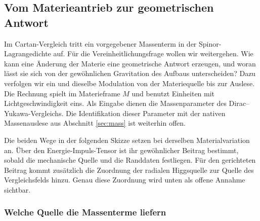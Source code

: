 \subsection{Vom Materieantrieb zur geometrischen Antwort}
\label{sec:op5-coupling}

Im Cartan-Vergleich tritt ein vorgegebener Massenterm in der Spinor-Lagrangedichte auf. Für die Vereinheitlichungsfrage wollen wir weitergehen. Wie kann eine Änderung der Materie eine geometrische Antwort erzeugen, und woran lässt sie sich von der gewöhnlichen Gravitation des Aufbaus unterscheiden? Dazu verfolgen wir ein und dieselbe Modulation von der Materiequelle bis zur Auslese. Die Rechnung spielt im Materieframe \(M\) und benutzt Einheiten mit Lichtgeschwindigkeit eins. Als Eingabe dienen die Massenparameter des Dirac--Yukawa-Vergleichs. Die Identifikation dieser Parameter mit der nativen Massenauslese aus Abschnitt \ref{sec:mass} ist weiterhin offen.

Die beiden Wege in der folgenden Skizze setzen bei derselben Materialvariation an. Über den Energie-Impuls-Tensor ist ihr gewöhnlicher Beitrag bestimmt, sobald die mechanische Quelle und die Randdaten festliegen. Für den gerichteten Beitrag kommt zusätzlich die Zuordnung der radialen Higgsquelle zur Quelle des Vergleichsfelds hinzu. Genau diese Zuordnung wird unten als offene Annahme sichtbar.



\subsubsection{Welche Quelle die Massenterme liefern}

